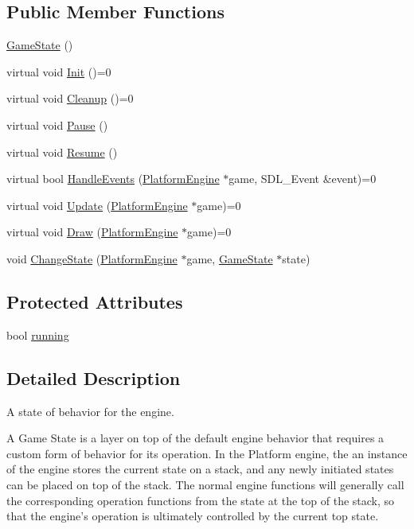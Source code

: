 \subsection*{Public Member Functions}
\begin{CompactItemize}
\item 
\hyperlink{class_game_state_4fa0a2bf50315c4a35a3890a0adcee5c}{GameState} ()
\item 
virtual void \hyperlink{class_game_state_eec488593bae214c0f738bd64dafba32}{Init} ()=0
\item 
virtual void \hyperlink{class_game_state_041e7a5430d71da84745af11abdacd93}{Cleanup} ()=0
\item 
virtual void \hyperlink{class_game_state_0c47c6969a4e0bb32d6cdf7bf9376817}{Pause} ()
\item 
virtual void \hyperlink{class_game_state_d12ece3c3fb066281b73b07a315f04e8}{Resume} ()
\item 
virtual bool \hyperlink{class_game_state_de7bd9bda91253614322ca0ea77b7a14}{HandleEvents} (\hyperlink{class_platform_engine}{PlatformEngine} $\ast$game, SDL\_\-Event \&event)=0
\item 
virtual void \hyperlink{class_game_state_100ca49bc95afce1d5c5b756708bbc2b}{Update} (\hyperlink{class_platform_engine}{PlatformEngine} $\ast$game)=0
\item 
virtual void \hyperlink{class_game_state_7333dda0f49b3fa1c01cd3295f853024}{Draw} (\hyperlink{class_platform_engine}{PlatformEngine} $\ast$game)=0
\item 
void \hyperlink{class_game_state_f786aeb704a22a135dc289bb89fcc452}{ChangeState} (\hyperlink{class_platform_engine}{PlatformEngine} $\ast$game, \hyperlink{class_game_state}{GameState} $\ast$state)
\end{CompactItemize}
\subsection*{Protected Attributes}
\begin{CompactItemize}
\item 
bool \hyperlink{class_game_state_391df04a740c7480270d3c71a578b43a}{running}
\end{CompactItemize}


\subsection{Detailed Description}
A state of behavior for the engine. 

A Game State is a layer on top of the default engine behavior that requires a custom form of behavior for its operation. In the Platform engine, the an instance of the engine stores the current state on a stack, and any newly initiated states can be placed on top of the stack. The normal engine functions will generally call the corresponding operation functions from the state at the top of the stack, so that the engine's operation is ultimately controlled by the current top state.


